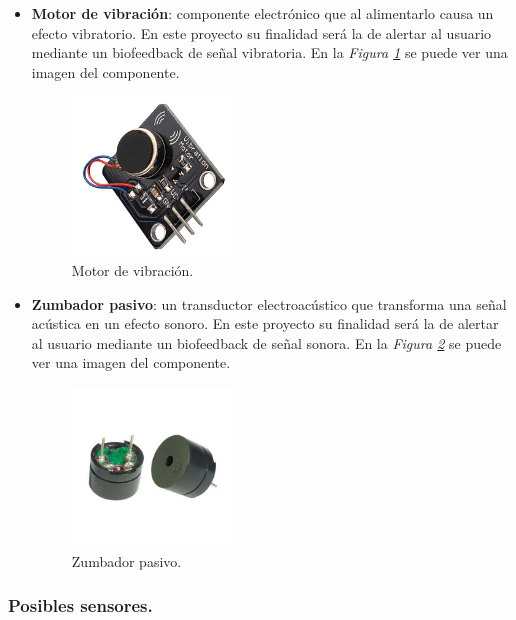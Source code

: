 \begin{itemize}
\item \textbf{Motor de vibración}: componente electrónico que al alimentarlo causa un efecto vibratorio. En este proyecto su finalidad será la de alertar al usuario mediante un biofeedback de señal vibratoria. En la \textit{Figura \ref{fig:motorVibr}} se puede ver una imagen del componente.
\begin{figure}[h!]
    \centering
    \includegraphics[width=0.4\textwidth]{img/MotorVibr.jpg}
    \caption{Motor de vibración.\cite{imgMotorVibr}}
    \label{fig:motorVibr} 
\end{figure}

\newpage
\item \textbf{Zumbador pasivo}: un transductor electroacústico que transforma una señal acústica en un efecto sonoro. En este proyecto su finalidad será la de alertar al usuario mediante un biofeedback de señal sonora. En la \textit{Figura \ref{fig:zumbador}} se puede ver una imagen del componente.
\begin{figure}[h!]
    \centering
    \includegraphics[width=0.4\textwidth]{img/imgZumbador.jpg}
    \caption{Zumbador pasivo.\cite{imgZumbador}}
    \label{fig:zumbador} 
\end{figure}

\end{itemize}

\newpage
\subsubsection{Posibles sensores.}

